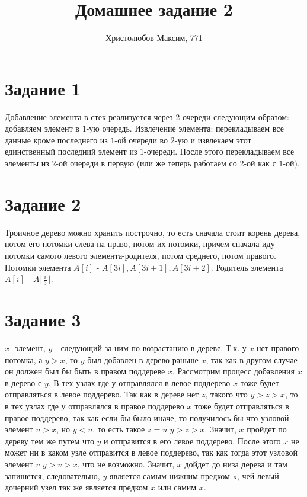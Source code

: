\documentclass[a4paper,12pt]{article}
\author{Христолюбов Максим, 771}
\title{Домашнее задание 2}
\date{ }
\begin{document}

\maketitle

\section*{Задание 1}
\hspace{0.5cm}
Добавление элемента в стек реализуется через 2 очереди следующим образом: добавляем элемент в $1$-ую очередь. Извлечение элемента: перекладываем все данные кроме последнего из $1$-ой очереди во $2$-ую и извлекаем этот единственный последний элемент из $1$-очереди. После этого перекладываем все элементы из $2$-ой очереди в первую (или же теперь работаем со $2$-ой как с $1$-ой).

\section*{Задание 2}
\hspace{0.5cm}
Троичное дерево можно хранить построчно, то есть сначала стоит корень дерева, потом его потомки слева на право, потом их потомки, причем сначала иду потомки самого левого элемента-родителя, потом среднего, потом правого. Потомки элемента $A[i]$ - $A[3i], A[3i+1], A[3i+2]$. Родитель элемента $A[i]$ - $A\lfloor\frac{i}{3}\rfloor$.

\section*{Задание 3}
\hspace{0.5cm}
$x$- элемент, $y$ - следующий за ним по возрастанию в дереве. Т.к. у $x$ нет правого потомка, а $y>x$, то $y$ был добавлен в дерево раньше $x$, так как в другом случае он должен был бы быть в правом поддереве $x$. Рассмотрим процесс добавления $x$ в дерево с $y$. В тех узлах где $у$ отправлялся в левое поддерево $x$ тоже будет отправляться в левое поддерево. Так как в дереве нет $z$, такого что $y>z>x$, то в тех узлах где $у$ отправлялся в правое поддерево $x$ тоже будет отправляться в правое поддерево, так как если бы было иначе, то получилось бы что узловой элемент $u>x$, но $y<u$, то есть такое $z=u$ $y>z>x$. Значит, $x$ пройдет по дереву тем же путем что $y$ и отправится в его левое поддерево. После этого $x$ не может ни в каком узле отправится в левое поддерево, так как тогда этот узловой элемент $v$ $y>v>x$, что не возможно. Значит, $x$ дойдет до низа дерева и там запишется, следовательно, $y$ является самым нижним предком x, чей левый дочерний узел так же является предком $x$ или самим $x$.
\end{document}
